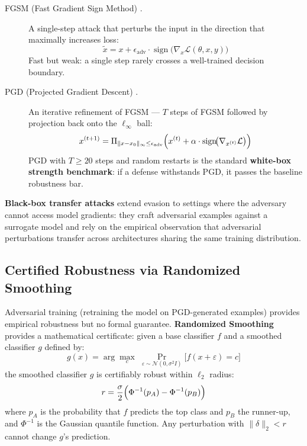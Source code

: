 \begin{description}
  \item[FGSM (Fast Gradient Sign Method) \cite{goodfellow2015}.]
    A single-step attack that perturbs the input in the direction that maximally increases loss:
    \begin{equation}
      \tilde{x} = x + \epsilon_{\mathrm{adv}} \cdot \operatorname{sign}\!\bigl(\nabla_x \mathcal{L}(\theta, x, y)\bigr)
      \label{eq:fgsm}
    \end{equation}
    Fast but weak: a single step rarely crosses a well-trained decision boundary.

  \item[PGD (Projected Gradient Descent) \cite{madry2018}.]
    An iterative refinement of FGSM — $T$ steps of FGSM followed by projection back onto the $\ell_\infty$ ball:
    \begin{equation}
      x^{(t+1)} = \Pi_{\|x - x_0\|_\infty \leq \epsilon_{\mathrm{adv}}} \Bigl( x^{(t)} + \alpha \cdot \operatorname{sign}\!\bigl(\nabla_{x^{(t)}} \mathcal{L}\bigr) \Bigr)
      \label{eq:pgd}
    \end{equation}
    PGD with $T \geq 20$ steps and random restarts is the standard \textbf{white-box strength benchmark}: if a defense withstands PGD, it passes the baseline robustness bar.
\end{description}

\textbf{Black-box transfer attacks} extend evasion to settings where the adversary cannot access model gradients: they craft adversarial examples against a surrogate model and rely on the empirical observation that adversarial perturbations transfer across architectures sharing the same training distribution.

\subsection{Certified Robustness via Randomized Smoothing}
\label{subsec:certified_robustness}

Adversarial training (retraining the model on PGD-generated examples) provides empirical robustness but no formal guarantee. \textbf{Randomized Smoothing} \cite{cohen2019} provides a mathematical certificate: given a base classifier $f$ and a smoothed classifier $g$ defined by:
\begin{equation}
  g(x) = \arg\max_c \; \Pr_{\varepsilon \sim \mathcal{N}(0, \sigma^2 I)}\!\bigl[f(x + \varepsilon) = c\bigr]
  \label{eq:smoothed_classifier}
\end{equation}
the smoothed classifier $g$ is certifiably robust within $\ell_2$ radius:
\begin{equation}
  r = \frac{\sigma}{2} \Bigl( \Phi^{-1}(p_A) - \Phi^{-1}(p_B) \Bigr)
  \label{eq:certified_radius}
\end{equation}
where $p_A$ is the probability that $f$ predicts the top class and $p_B$ the runner-up, and $\Phi^{-1}$ is the Gaussian quantile function. Any perturbation with $\|\delta\|_2 < r$ cannot change $g$'s prediction.

